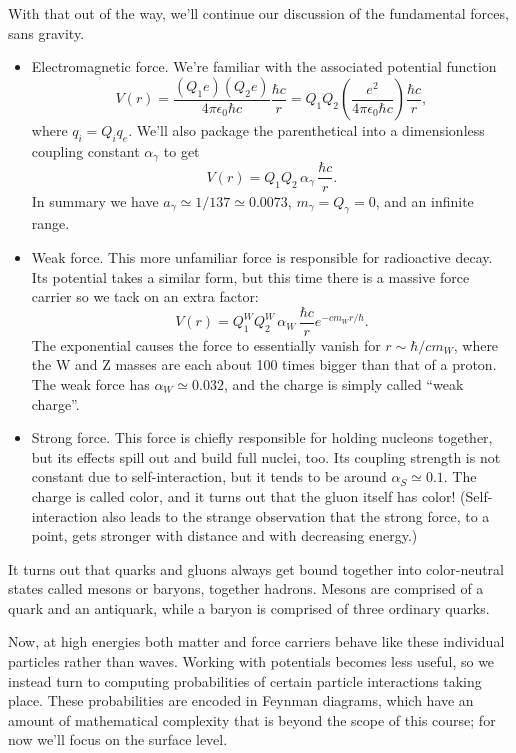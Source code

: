\documentclass[../p052main.tex]{subfiles}
\begin{document}
With that out of the way, we'll continue our discussion of the fundamental forces, sans gravity.
\begin{itemize}
    \item Electromagnetic force.
    We're familiar with the associated potential function
    \[ V(r) = \frac{(Q_1 e)(Q_2 e)}{4\pi \epsilon_0 \hbar c} \frac{\hbar c}{r} = Q_1 Q_2 \left( \frac{e^2}{4\pi \epsilon_0 \hbar c} \right) \frac{\hbar c}{r}, \]
    where $q_i = Q_i q_e$.
    We'll also package the parenthetical into a dimensionless coupling constant $\alpha_\gamma$ to get
    \[ V(r) = Q_1 Q_2 \,\alpha_\gamma\, \frac{\hbar c}{r}. \]
    In summary we have $a_\gamma \simeq 1 / 137 \simeq 0.0073$, $m_\gamma = Q_\gamma = 0$, and an infinite range.

    \item Weak force.
    This more unfamiliar force is responsible for radioactive decay.
    Its potential takes a similar form, but this time there is a massive force carrier so we tack on an extra factor:
    \[ V(r) = Q_1^W Q_2^W \,\alpha_W\, \frac{\hbar c}{r} e^{-c m_W r / \hbar}. \]
    The exponential causes the force to essentially vanish for $r \sim \hbar / cm_W$, where the W and Z masses are each about 100 times bigger than that of a proton.
    The weak force has $\alpha_W \simeq 0.032$, and the charge is simply called ``weak charge''.

    \item Strong force.
    This force is chiefly responsible for holding nucleons together, but its effects spill out and build full nuclei, too.
    Its coupling strength is not constant due to self-interaction, but it tends to be around $\alpha_S \simeq 0.1$.
    The charge is called color, and it turns out that the gluon itself has color!
    (Self-interaction also leads to the strange observation that the strong force, to a point, gets stronger with distance and with decreasing energy.)
\end{itemize}
It turns out that quarks and gluons always get bound together into color-neutral states called mesons or baryons, together hadrons.
Mesons are comprised of a quark and an antiquark, while a baryon is comprised of three ordinary quarks.

Now, at high energies both matter and force carriers behave like these individual particles rather than waves.
Working with potentials becomes less useful, so we instead turn to computing probabilities of certain particle interactions taking place.
These probabilities are encoded in Feynman diagrams, which have an amount of mathematical complexity that is beyond the scope of this course; for now we'll focus on the surface level.
\end{document}
